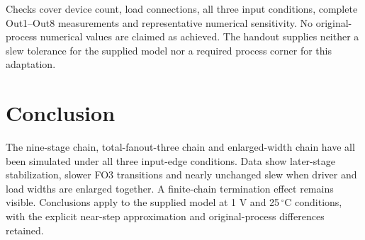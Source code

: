 Checks cover device count, load connections, all three input conditions, complete Out1--Out8 measurements and representative numerical sensitivity. No original-process numerical values are claimed as achieved. The handout supplies neither a slew tolerance for the supplied model nor a required process corner for this adaptation.

\section{Conclusion}
The nine-stage chain, total-fanout-three chain and enlarged-width chain have all been simulated under all three input-edge conditions. Data show later-stage stabilization, slower FO3 transitions and nearly unchanged slew when driver and load widths are enlarged together. A finite-chain termination effect remains visible. Conclusions apply to the supplied model at 1 V and 25\,$^\circ$C conditions, with the explicit near-step approximation and original-process differences retained.
